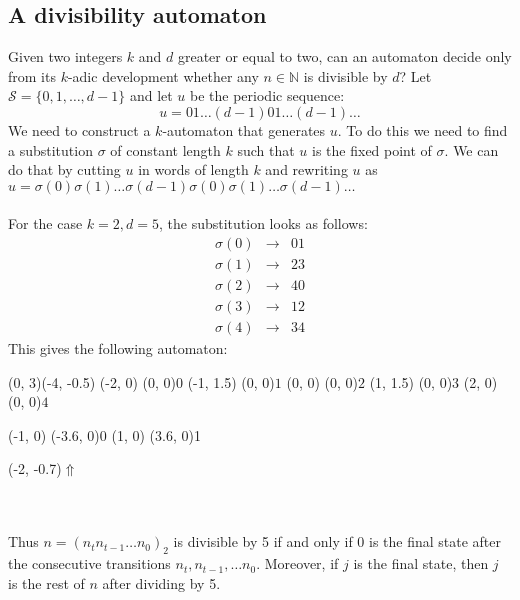 \documentclass{article}
\begin{document}
\subsection{A divisibility automaton}
Given two integers $k$ and $d$ greater or equal to two, can an automaton 
decide only from its $k$-adic development whether any $n \in \mathbb{N}$ is
divisible by $d$? Let $\mathcal{S} = \{0, 1, \ldots, d - 1\}$ and let $u$ be the
periodic sequence:
\begin{displaymath}
  u = 01\ldots(d - 1)01\ldots(d - 1)\ldots
\end{displaymath}
We need to construct a $k$-automaton that generates $u$. To do this we need to
find a substitution $\sigma$ of constant length $k$ such that $u$ is the fixed
point of $\sigma$. We can do that by cutting $u$ in words of length $k$ and
rewriting $u$ as
$u = \sigma(0)\sigma(1)\ldots\sigma(d - 1)\sigma(0)\sigma(1)\ldots\sigma(d - 1)\ldots$\\
\\
For the case $k = 2, d = 5$, the substitution looks as follows:\\
\vbox{\begin{eqnarray*}
  \sigma(0) &\to& 01\\
  \sigma(1) &\to& 23\\
  \sigma(2) &\to& 40\\
  \sigma(3) &\to& 12\\
  \sigma(4) &\to& 34
\end{eqnarray*}}
This gives the following automaton:\\
\begin{graph}(0, 3)(-4, -0.5)
  (-2, 0) (0, 0){$0$}
  (-1, 1.5) (0, 0){$1$}
  (0, 0) (0, 0){$2$}
  (1, 1.5) (0, 0){$3$}
  (2, 0) (0, 0){$4$}

  (-1, 0) \freetext(-3.6, 0){0}
   
   
   
   
   
   
   
   
  (1, 0) \freetext(3.6, 0){1}

  \freetext(-2, -0.7){$\Uparrow$}
\end{graph}\\
\\
Thus $n = (n_t n_{t - 1} \ldots n_0)_2$ is divisible by 5 if and only if 0 is
the final state after the consecutive transitions $n_t, n_{t - 1}, \ldots n_0$.
Moreover, if $j$ is the final state, then $j$ is the rest of $n$ after dividing
by 5.
\end{document}
